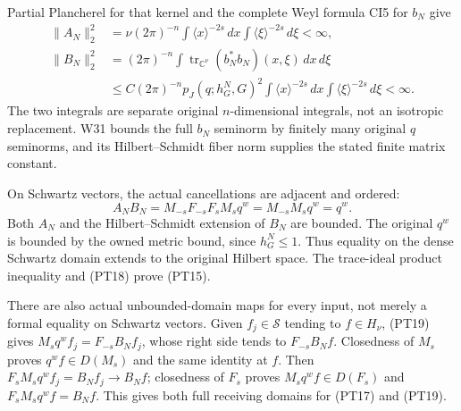 \documentclass[
  11pt,
]{article}
\begin{document}
Partial Plancherel for that kernel and the complete Weyl formula CI5 for
\(b_N\) give \[
 \begin{split}
 \|A_N\|_2^2
 &=\nu(2\pi)^{-n}
       \int\langle x\rangle^{-2s}\,dx
       \int\langle\xi\rangle^{-2s}\,d\xi<\infty,\\
 \|B_N\|_2^2
 &=(2\pi)^{-n}\int
       \operatorname{tr}_{\mathbb C^\nu}(b_N^*b_N)(x,\xi)
                                      \,dx\,d\xi\\
 &\leq C(2\pi)^{-n}p_J(q;h_G^N,G)^2
       \int\langle x\rangle^{-2s}\,dx
       \int\langle\xi\rangle^{-2s}\,d\xi<\infty.
 \end{split}                                                     \tag{PT18}
\] The two integrals are separate original \(n\)-dimensional integrals,
not an isotropic replacement. W31 bounds the full \(b_N\) seminorm by
finitely many original \(q\) seminorms, and its Hilbert--Schmidt fiber
norm supplies the stated finite matrix constant.

On Schwartz vectors, the actual cancellations are adjacent and ordered:
\[
 A_NB_N=M_{-s}F_{-s}F_sM_sq^w
             =M_{-s}M_sq^w=q^w.                               \tag{PT19}
\] Both \(A_N\) and the Hilbert--Schmidt extension of \(B_N\) are
bounded. The original \(q^w\) is bounded by the owned metric bound,
since \(h_G^N\leq1\). Thus equality on the dense Schwartz domain extends
to the original Hilbert space. The trace-ideal product inequality and
(PT18) prove (PT15).

There are also actual unbounded-domain maps for every input, not merely
a formal equality on Schwartz vectors. Given \(f_j\in\mathcal S\)
tending to \(f\in H_\nu\), (PT19) gives \(M_sq^wf_j=F_{-s}B_Nf_j\),
whose right side tends to \(F_{-s}B_Nf\). Closedness of \(M_s\) proves
\(q^wf\in D(M_s)\) and the same identity at \(f\). Then
\(F_sM_sq^wf_j=B_Nf_j\to B_Nf\); closedness of \(F_s\) proves
\(M_sq^wf\in D(F_s)\) and \(F_sM_sq^wf=B_Nf\). This gives both full
receiving domains for (PT17) and (PT19).
\end{document}
